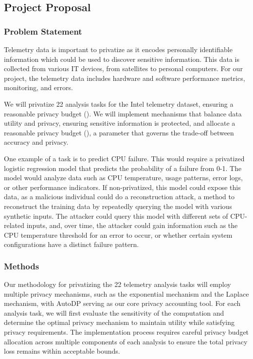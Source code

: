 \documentclass[12pt,letterpaper]{article}
\begin{document}
{%

\clearpage
\makeappendix

\subsection{Project Proposal}


% 

\subsubsection{Problem Statement}

Telemetry data is important to privatize as it encodes personally identifiable information which could be used to discover sensitive information. This data is collected from various IT devices, from satellites to personal computers. For our project, the telemetry data includes hardware and software performance metrics, monitoring, and errors. 

We will privatize 22 analysis tasks for the Intel telemetry dataset, ensuring a reasonable privacy budget (). We will implement mechanisms that balance data utility and privacy, ensuring sensitive information is protected, and allocate a reasonable privacy budget (), a parameter that governs the trade-off between accuracy and privacy.

One example of a task is to predict CPU failure. This would require a privatized logistic regression model that predicts the probability of a failure from 0-1. The model would analyze data such as CPU temperature, usage patterns, error logs, or other performance indicators. If non-privatized, this model could expose this data, as a malicious individual could do a reconstruction attack, a method to reconstruct the training data by repeatedly querying the model with various synthetic inputs. The attacker could query this model with different sets of CPU-related inputs, and, over time, the attacker could gain information such as the CPU temperature threshold for an error to occur, or whether certain system configurations have a distinct failure pattern.

\subsubsection{Methods}

Our methodology for privatizing the 22 telemetry analysis tasks will employ multiple privacy mechanisms, such as the exponential mechanism and the Laplace mechanism, with AutoDP serving as our core privacy accounting tool. For each analysis task, we will first evaluate the sensitivity of the computation and determine the optimal privacy mechanism to maintain utility while satisfying privacy requirements. The implementation process requires careful privacy budget allocation across multiple components of each analysis to ensure the total privacy loss remains within acceptable bounds.

}
\end{document}
